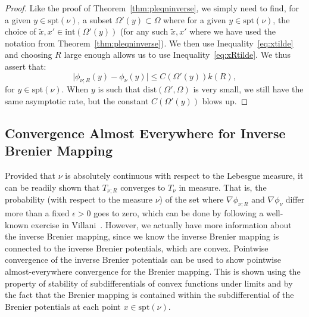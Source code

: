 \documentclass{amsart}
\theoremstyle{lemma}
\theoremstyle{remark}
\begin{document}
\begin{proof}
Like the proof of Theorem~\ref{thm:pleqninverse}, we simply need to find, for a given $y \in \text{spt}(\nu)$, a subset $\Omega '(y) \subset \Omega$ where for a given $y \in \text{spt}(\nu)$, the choice of $\tilde{x}, x' \in \text{int}(\Omega '(y))$ (for any such $\tilde{x}, x'$ where we have used the notation from Theorem~\ref{thm:pleqninverse}). We then use Inequality~\eqref{eq:xtilde} and choosing $R$ large enough allows us to use Inequality~\eqref{eq:xRtilde}. We thus assert that:
\begin{equation}
\vert \phi_{\nu;R}(y) - \phi_{\nu}(y) \vert \leq C(\Omega '(y))k(R),
\end{equation}
for $y \in \text{spt}(\nu)$. When $y$ is such that $\text{dist}(\Omega ', \Omega)$ is very small, we still have the same asymptotic rate, but the constant $C(\Omega '(y))$ blows up.

\end{proof}



\subsection{Convergence Almost Everywhere for Inverse Brenier Mapping}\label{sec:inversemap}

Provided that $\nu$ is absolutely continuous with respect to the Lebesgue measure, it can be readily shown that $T_{\nu;R}$ converges to $T_{\nu}$ in measure. That is, the probability (with respect to the measure $\nu$) of the set where $\nabla \phi_{\nu;R}$ and $\nabla \phi_{\nu}$ differ more than a fixed $\epsilon>0$ goes to zero, which can be done by following a well-known exercise in Villani~\cite{Villani1}. However, we actually have more information about the inverse Brenier mapping, since we know the inverse Brenier mapping is connected to the inverse Brenier potentials, which are convex. Pointwise convergence of the inverse Brenier potentials can be used to show pointwise almost-everywhere convergence for the Brenier mapping. This is shown using the property of stability of subdifferentials of convex functions under limits and by the fact that the Brenier mapping is contained within the subdifferential of the Brenier potentials at each point $x \in \text{spt}(\nu)$.
\end{document}
